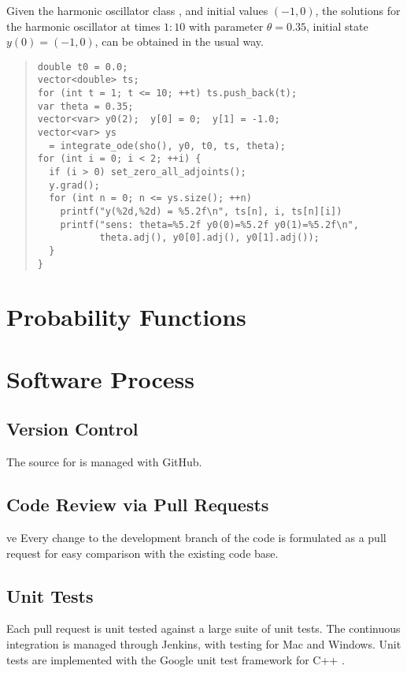 \documentclass[10pt]{article}
\begin{document}
Given the harmonic oscillator class , and initial values
$(-1,0)$, the solutions for the harmonic oscillator at times $1{:}10$
with parameter $\theta = 0.35$, initial state $y(0) = (-1,0)$, can be
obtained in the usual way.
%
\begin{quote}
\begin{Verbatim}
double t0 = 0.0;   
vector<double> ts;  
for (int t = 1; t <= 10; ++t) ts.push_back(t);
var theta = 0.35;
vector<var> y0(2);  y[0] = 0;  y[1] = -1.0;
vector<var> ys 
  = integrate_ode(sho(), y0, t0, ts, theta);
for (int i = 0; i < 2; ++i) {
  if (i > 0) set_zero_all_adjoints();
  y.grad();
  for (int n = 0; n <= ys.size(); ++n) 
    printf("y(%2d,%2d) = %5.2f\n", ts[n], i, ts[n][i])
    printf("sens: theta=%5.2f y0(0)=%5.2f y0(1)=%5.2f\n",
           theta.adj(), y0[0].adj(), y0[1].adj());
  }
}
\end{Verbatim}
\end{quote}





\section{Probability Functions}


\section{Software Process}

\subsection{Version Control}

The source for  is managed with GitHub.  

\subsection{Code Review via Pull Requests}
ve
Every change to the development branch of the code is formulated as a
pull request for easy comparison with the existing code base.  

\subsection{Unit Tests}

Each pull request is unit tested against a large suite of unit tests.
The continuous integration is managed through Jenkins, with testing
for Mac and Windows.  Unit tests are implemented with the Google unit
test framework for C++ \citep{GoogleTest:2014}.
\end{document}
